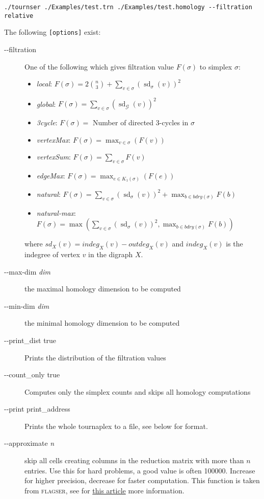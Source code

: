 \documentclass{amsart}
\theoremstyle{definition}
\newcommand{\sd}{\operatorname{\mathrm{sd}}}
\begin{document}
\begin{verbatim}./tournser ./Examples/test.trn ./Examples/test.homology --filtration relative\end{verbatim}

\vspace{1em}

\noindent
The following \texttt{[options]} exist:

\enlargethispage{\baselineskip}
\begin{description} 
  \item [-{}-filtration] One of the following which gives filtration value $F(\sigma)$ to simplex $\sigma$:
  \begin{itemize}
    \item \emph{local}: $F(\sigma)=2\binom{n}{3}+\sum_{v\in \sigma}(\sd_\sigma(v))^2$
    \item \emph{global}:  $F(\sigma)=\sum_{v\in \sigma}(\sd_\mathcal{G}(v))^2$
    \item \emph{3cycle}: $F(\sigma)=$ Number of directed 3-cycles in $\sigma$
    \item \emph{vertexMax}: $F(\sigma)=\max_{v\in\sigma}(F(v))$
    \item \emph{vertexSum}: $F(\sigma)=\sum_{v\in\sigma}F(v)$
    \item \emph{edgeMax}: $F(\sigma)=\max_{e\in K_1(\sigma)}(F(e))$
    \item \emph{natural}: $F(\sigma)=\sum_{v\in \sigma}(\sd_\sigma(v))^2+\max_{b\in bdry(\sigma)}F(b)$
    \item \emph{natural-max}: $F(\sigma)=\max(\sum_{v\in \sigma}(\sd_\sigma(v))^2,\max_{b\in bdry(\sigma)}F(b))$
  \end{itemize} 
  where $sd_X(v)=indeg_X(v)-outdeg_X(v)$ and $indeg_X(v)$ is the indegree of vertex $v$ in the digraph $X$.
  \item [-{}-max-dim \textit{dim}] the maximal homology dimension to be computed
  \item [-{}-min-dim \textit{dim}] the minimal homology dimension to be computed
  \item [-{}-print\_dist true] Prints the distribution of the filtration values
  \item [-{}-count\_only true] Computes only the simplex counts and skips all homology computations
  \item [-{}-print print\_address] Prints the whole tournaplex to a file, see below for format.
  \item [-{}-approximate \textit{n}] skip all cells creating columns in the reduction matrix with
    more than $n$ entries. Use this for hard problems, a good value is often 100000. Increase for
    higher precision, decrease for faster computation. This function is taken from \textsc{flagser}, see for \href{https://www.mdpi.com/1999-4893/13/1/19}{this article} more information.
\end{description}
\end{document}
